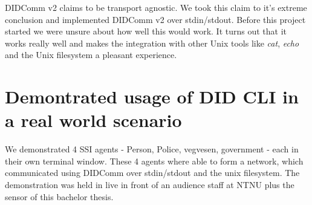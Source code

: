 DIDComm v2 claims to be transport agnostic. We took this claim to it's extreme conclusion and implemented DIDComm v2 over stdin/stdout. Before this project started we were unsure about how well this would work. It turns out that it works really well and makes the integration with other Unix tools like \textit{cat}, \textit{echo} and the Unix filesystem  a pleasant experience.



\section{Demontrated usage of DID CLI in a real world scenario}

We demonstrated 4 SSI agents - Person, Police, vegvesen, government - each in their own terminal window. These 4 agents where able to form a network, which communicated using DIDComm over stdin/stdout and the unix filesystem. The demonstration was held in live in front of an audience staff at NTNU plus the sensor of this bachelor thesis.

